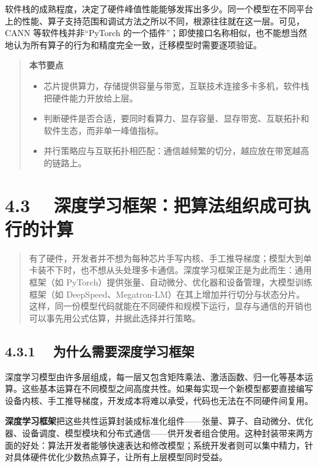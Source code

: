 \documentclass{article}
\begin{document}
软件栈的成熟程度，决定了硬件峰值性能能够发挥出多少。同一个模型在不同平台上的性能、算子支持范围和调试方法之所以不同，根源往往就在这一层。可见，CANN 等软件栈并非“PyTorch 的一个插件”；即使接口名称相似，也不能想当然地认为所有算子的行为和精度完全一致，迁移模型时需要逐项验证。

\begin{quote}
\textbf{本节要点}


\begin{itemize}[leftmargin=1.5em]
  \item 芯片提供算力，存储提供容量与带宽，互联技术连接多卡多机，软件栈把硬件能力开放给上层。
  \item 判断硬件是否合适，要同时看算力、显存容量、显存带宽、互联拓扑和软件生态，而非单一峰值指标。
  \item 并行策略应与互联拓扑相匹配：通信越频繁的切分，越应放在带宽越高的链路上。
\end{itemize}
\end{quote}

\section*{4.3　 深度学习框架：把算法组织成可执行的计算}


\begin{quote}


\noindent 有了硬件，开发者并不想为每种芯片手写内核、手工推导梯度；模型大到单卡装不下时，也不想从头处理多卡通信。深度学习框架正是为此而生：通用框架（如 PyTorch）提供张量、自动微分、优化器和设备管理，大模型训练框架（如 DeepSpeed、Megatron-LM）在其上增加并行切分与状态分片。这样，同一份模型代码就能在不同硬件和规模下运行，显存与通信的开销也可以事先用公式估算，并据此选择并行策略。


\end{quote}

\subsection*{4.3.1　 为什么需要深度学习框架}

深度学习模型由许多层组成，每一层又包含矩阵乘法、激活函数、归一化等基本运算。这些基本运算在不同模型之间高度共性。如果每实现一个新模型都要直接编写设备内核、手工推导梯度，开发成本将难以承受，代码也无法在不同硬件间复用。

\textbf{深度学习框架}把这些共性运算封装成标准化组件——张量、算子、自动微分、优化器、设备调度、模型模块和分布式通信——供开发者组合使用\cite{zhang2023d2l}。这种封装带来两方面的好处：算法开发者能够快速表达和修改模型；系统开发者则可以集中精力，针对具体硬件优化少数热点算子，让所有上层模型同时受益。
\end{document}
